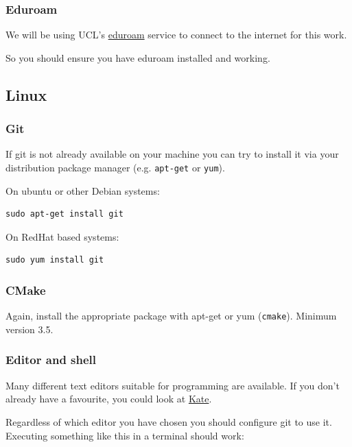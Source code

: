 \subsubsection{Eduroam}\label{eduroam}

We will be using UCL's
\href{http://www.ucl.ac.uk/isd/staff/wireless/eduroam}{eduroam} service
to connect to the internet for this work.

So you should ensure you have eduroam installed and working.

\subsection{Linux}\label{linux}

\subsubsection{Git}\label{git-1}

If git is not already available on your machine you can try to install
it via your distribution package manager (e.g. \texttt{apt-get} or
\texttt{yum}).

On ubuntu or other Debian systems:

\begin{verbatim}
sudo apt-get install git
\end{verbatim}

On RedHat based systems:

\begin{verbatim}
sudo yum install git
\end{verbatim}

\subsubsection{CMake}\label{cmake-1}

Again, install the appropriate package with apt-get or yum
(\texttt{cmake}). Minimum version 3.5.

\subsubsection{Editor and shell}\label{editor-and-shell}

Many different text editors suitable for programming are available. If
you don't already have a favourite, you could look at
\href{http://kate-editor.org/}{Kate}.

Regardless of which editor you have chosen you should configure git to
use it. Executing something like this in a terminal should work:

